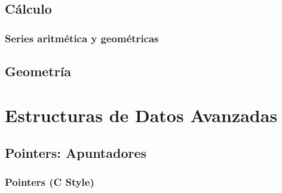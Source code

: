 \documentclass[12pt, fleqn]{report}                             %
\theoremstyle{break}                                            %
\begin{document}
    \chapter{Cálculo}

        \section{Series aritmética y geométricas}

        
    \clearpage
    \chapter{Geometría}




\part{Estructuras de Datos Avanzadas}
\label{part:EstructurasDeDatosAvanzadas}

    \clearpage
    \chapter{Pointers: Apuntadores}


        \clearpage
        \section{Pointers (C Style)}
\end{document}
